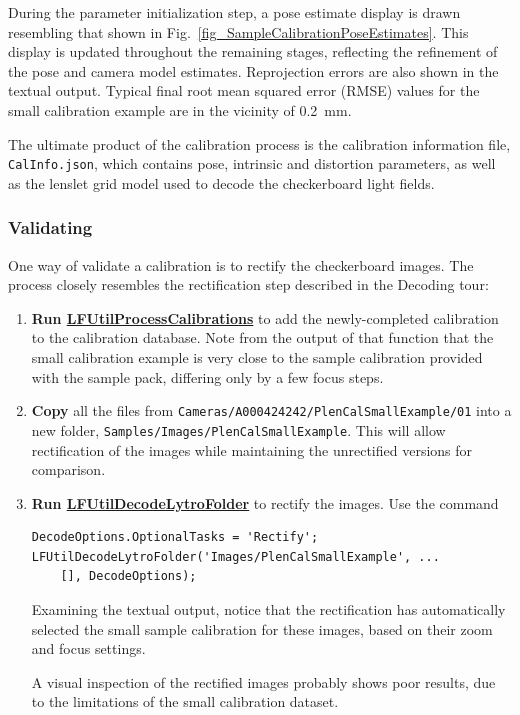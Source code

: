 \documentclass[onecolumn]{article}
\newcommand{\CiteFunction}[1]{\hyperlink{#1}{\small #1}}
\newcommand{\SymbolText}[1]{\texttt{\small #1}}
\begin{document}
\begin{enumerate}[leftmargin=1.5em,rightmargin=0.5cm]
During the parameter initialization step, a pose estimate display is drawn resembling that shown in  Fig.~\ref{fig_SampleCalibrationPoseEstimates}. This display is updated throughout the remaining stages, reflecting the refinement of the pose and camera model estimates.  Reprojection errors are also shown in the textual output.  Typical final root mean squared error (RMSE) values for the small calibration example are in the vicinity of 0.2~mm. 

The ultimate product of the calibration process is the calibration information file, \SymbolText{CalInfo.json}, which contains pose, intrinsic and distortion parameters, as well as the lenslet grid model used to decode the checkerboard light fields.

\end{enumerate}

\subsubsection{Validating}

One way of validate a calibration is to rectify the checkerboard images. The process closely resembles the rectification step described in the Decoding tour:

\begin{enumerate}[leftmargin=1.5em,rightmargin=0.5cm]

\item \textbf{Run \CiteFunction{LFUtilProcessCalibrations}} to add the newly-completed calibration to the calibration database.  Note from the output of that function that the small calibration example is very close to the sample calibration provided with the sample pack, differing only by a few focus steps.

\item \textbf{Copy} all the files from \SymbolText{Cameras/A000424242/PlenCalSmallExample/01} into a new folder, \SymbolText{Samples/Images/PlenCalSmallExample}. This will allow rectification of the images while maintaining the unrectified versions for comparison.

\item \textbf{Run \CiteFunction{LFUtilDecodeLytroFolder}} to rectify the images.  Use the command
\begin{Verbatim}
DecodeOptions.OptionalTasks = 'Rectify';
LFUtilDecodeLytroFolder('Images/PlenCalSmallExample', ...
    [], DecodeOptions);
\end{Verbatim}

Examining the textual output, notice that the rectification has automatically selected the small sample calibration for these images, based on their zoom and focus settings.

A visual inspection of the rectified images probably shows poor results, due to the limitations of the small calibration dataset.  

\end{enumerate}
\end{document}
